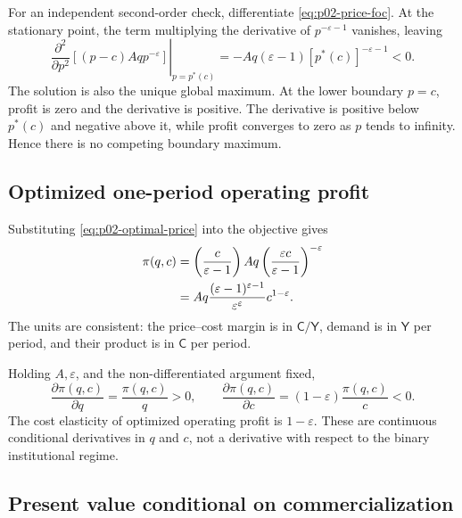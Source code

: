 For an independent second-order check, differentiate
\eqref{eq:p02-price-foc}. At the stationary point, the term multiplying the
derivative of \(p^{-\varepsilon-1}\) vanishes, leaving
\begin{equation}
  \left.
  \frac{\partial^2}{\partial p^2}
  \left[(p-c)Aq p^{-\varepsilon}\right]
  \right|_{p=p^*(c)}
  =-Aq(\varepsilon-1)
   \left[p^*(c)\right]^{-\varepsilon-1}<0.
  \label{eq:p02-price-soc}
\end{equation}
The solution is also the unique global maximum. At the lower boundary
\(p=c\), profit is zero and the derivative is positive. The derivative is
positive below \(p^*(c)\) and negative above it, while profit converges to zero
as \(p\) tends to infinity. Hence there is no competing boundary maximum.

\subsection{Optimized one-period operating profit}
\label{subsec:p02-operating-profit}

Substituting \eqref{eq:p02-optimal-price} into the objective gives
\begin{align}
  \pi(q,c)
  &=\left(\frac{c}{\varepsilon-1}\right)
    Aq\left(\frac{\varepsilon c}{\varepsilon-1}\right)^{-\varepsilon}
    \notag\\
  &=Aq
    \frac{(\varepsilon-1)^{\varepsilon-1}}
         {\varepsilon^{\varepsilon}}
    c^{1-\varepsilon}.
  \label{eq:p02-operating-profit}
\end{align}
The units are consistent: the price--cost margin is in
\(\mathsf C/\mathsf Y\), demand is in \(\mathsf Y\) per period, and their
product is in \(\mathsf C\) per period.

Holding \(A,\varepsilon\), and the non-differentiated argument fixed,
\begin{equation}
  \frac{\partial\pi(q,c)}{\partial q}
  =\frac{\pi(q,c)}{q}>0,
  \qquad
  \frac{\partial\pi(q,c)}{\partial c}
  =(1-\varepsilon)\frac{\pi(q,c)}{c}<0.
  \label{eq:p02-profit-derivatives}
\end{equation}
The cost elasticity of optimized operating profit is \(1-\varepsilon\).
These are continuous conditional derivatives in \(q\) and \(c\), not a
derivative with respect to the binary institutional regime.

\subsection{Present value conditional on commercialization}
\label{subsec:p02-present-value}

